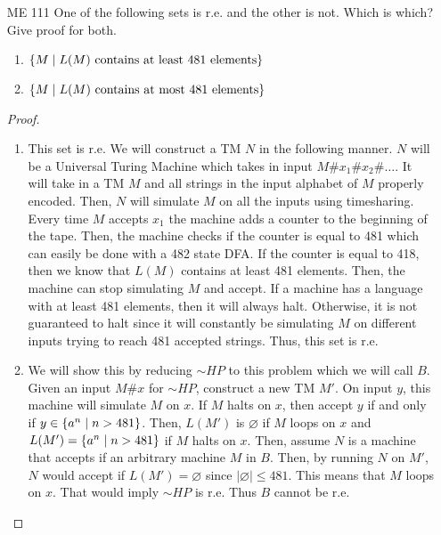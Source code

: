 \documentclass{article}
\newcommand{\es}{\varnothing}
\newcommand{\ifff}{if and only if }
\newcommand{\setst}{\hspace{1mm} | \hspace{1mm} }
\theoremstyle{definition}
\begin{document}
\begin{enumerate}
\begin{proof}
		To see closure under intersection, we will construct an almost identical TM, $M_i$ to the one in the previous part. Again, it will simulate $M_A$ and $M_B$ using timesharing. The only difference is that $M_i$ will only accept on $x$ when both $M_A$ and $M_B$ would have accepted $x$. 
	\end{proof}
	\item[ME 111] One of the following sets is r.e. and the other is not. Which is which?
	Give proof for both.
	\begin{enumerate}
		\item $\{M \setst L(M) \text{ contains at least 481 elements}\}$
		\item $\{M \setst L(M) \text{ contains at most 481 elements}\}$
	\end{enumerate}
	\begin{proof}
		\leavevmode
		\begin{enumerate}
			\item This set is r.e. We will construct a TM $N$ in the following manner. $N$ will be a Universal Turing Machine which takes in input $M\#x_1\#x_2\#\ldots$. It will take in a TM $M$ and all strings in the input alphabet of $M$ properly encoded. Then, $N$ will simulate $M$ on all the inputs using timesharing. Every time $M$ accepts $x_1$ the machine adds a counter to the beginning of the tape. Then, the machine checks if the counter is equal to 481 which can easily be done with a 482 state DFA. If  the counter is equal to 418, then we know that $L(M)$ contains at least 481 elements. Then, the machine can stop simulating $M$ and accept. If a machine has a language with at least 481 elements, then it will always halt. Otherwise, it is not guaranteed to halt since it will constantly be simulating $M$ on different inputs trying to reach 481 accepted strings. Thus, this set is r.e.
			\item 
			We will show this by reducing $\sim HP$ to this problem which we will call $B$. Given an input $M\#x$ for $\sim HP$, construct a new TM $M'$. On input $y$, this machine will simulate $M$ on $x$. If $M$ halts on $x$, then accept $y$ \ifff $y \in \{a^n \setst n > 481\}$. Then, $L(M')$ is $\es$ if $M$ loops on $x$ and $L(M') = \{a^n \setst n > 481\}$ if $M$ halts on $x$. Then, assume $N$ is a machine that accepts if an arbitrary machine $M$ in $B$. Then, by running $N$ on $M'$, $N$ would accept if $L(M') = \es$  since $|\es| \leq 481$. This means that $M$ loops on $x$. That would imply $\sim HP$ is r.e. Thus $B$ cannot be r.e.
					

\end{enumerate}
\end{proof}
\end{enumerate}
\end{document}
